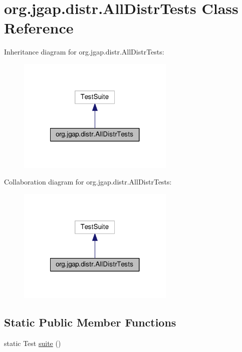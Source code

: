 \hypertarget{classorg_1_1jgap_1_1distr_1_1_all_distr_tests}{\section{org.\-jgap.\-distr.\-All\-Distr\-Tests Class Reference}
\label{classorg_1_1jgap_1_1distr_1_1_all_distr_tests}
}


Inheritance diagram for org.\-jgap.\-distr.\-All\-Distr\-Tests\-:
\nopagebreak
\begin{figure}[H]
\begin{center}
\leavevmode
\includegraphics[width=212pt]{classorg_1_1jgap_1_1distr_1_1_all_distr_tests__inherit__graph}
\end{center}
\end{figure}


Collaboration diagram for org.\-jgap.\-distr.\-All\-Distr\-Tests\-:
\nopagebreak
\begin{figure}[H]
\begin{center}
\leavevmode
\includegraphics[width=212pt]{classorg_1_1jgap_1_1distr_1_1_all_distr_tests__coll__graph}
\end{center}
\end{figure}
\subsection*{Static Public Member Functions}
\begin{DoxyCompactItemize}
\item 
static Test \hyperlink{classorg_1_1jgap_1_1distr_1_1_all_distr_tests_a38f6a214902fa0a231b35e67631c477a}{suite} ()
\end{DoxyCompactItemize}

